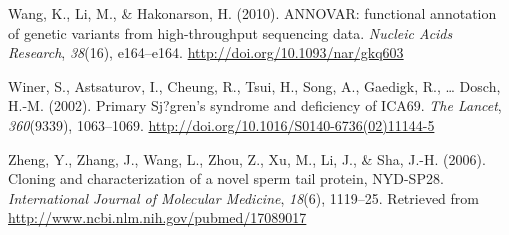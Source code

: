 \documentclass[12pt,twoside]{reedthesis}
\theoremstyle{definition}
\theoremstyle{definition}
\theoremstyle{remark}
\begin{document}
  \hypertarget{ref-Wang2010}{}
  Wang, K., Li, M., \& Hakonarson, H. (2010). ANNOVAR: functional
  annotation of genetic variants from high-throughput sequencing data.
  \emph{Nucleic Acids Research}, \emph{38}(16), e164--e164.
  \url{http://doi.org/10.1093/nar/gkq603}
  
  \hypertarget{ref-Winer2002}{}
  Winer, S., Astsaturov, I., Cheung, R., Tsui, H., Song, A., Gaedigk, R.,
  \ldots{} Dosch, H.-M. (2002). Primary Sj?gren's syndrome and deficiency
  of ICA69. \emph{The Lancet}, \emph{360}(9339), 1063--1069.
  \url{http://doi.org/10.1016/S0140-6736(02)11144-5}
  
  \hypertarget{ref-Zheng2006}{}
  Zheng, Y., Zhang, J., Wang, L., Zhou, Z., Xu, M., Li, J., \& Sha, J.-H.
  (2006). Cloning and characterization of a novel sperm tail protein,
  NYD-SP28. \emph{International Journal of Molecular Medicine},
  \emph{18}(6), 1119--25. Retrieved from
  \url{http://www.ncbi.nlm.nih.gov/pubmed/17089017}


\end{document}
